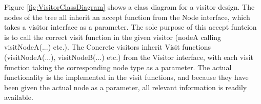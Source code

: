 Figure \ref{fig:VisitorClassDiagram} shows a class diagram for a visitor design. The nodes of the tree all inherit an accept function from the Node interface, which takes a visitor interface as a parameter. The sole purpose of this accept funtcion is to call the correct visit function in the given visitor (nodeA calling visitNodeA(...) etc.). The Concrete visitors inherit Visit functions (visitNodeA(...), visitNodeB(...) etc.) from the Visitor interface, with each visit function taking the corresponding node type as a parameter. The actual functionality is the implemented in the visit functions, and because they have been given the actual node as a parameter, all relevant information is readily available.
